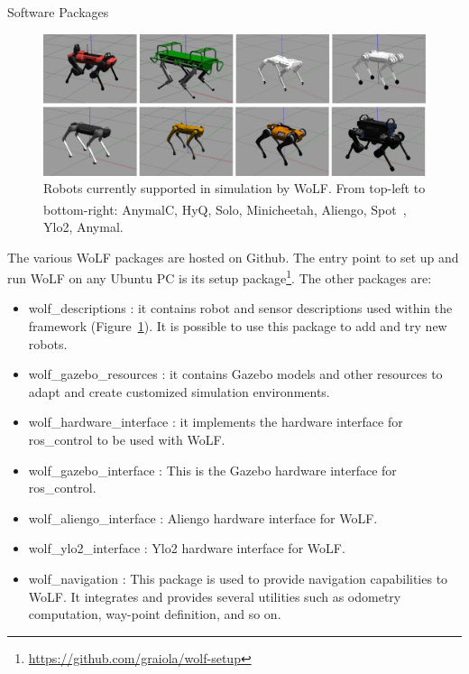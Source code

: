 \begin{myblock}{\large Software Packages}

	\begin{figure}[thb!]
		\centering
		\includegraphics[width=0.8\columnwidth]{images/all_robots.pdf}
		\caption{Robots currently supported in simulation by WoLF. From top-left to bottom-right: AnymalC, HyQ, Solo, Minicheetah, Aliengo, Spot\textsuperscript\textregistered \ , Ylo2, Anymal.}
		\label{fig:robots}
	\end{figure}
	
	The various WoLF packages are hosted on Github. The entry point to set up and run WoLF on any Ubuntu PC is its setup package\footnote{\url{https://github.com/graiola/wolf-setup}}. The other packages are:
	\begin{itemize}
		\item wolf\_descriptions%
		: it contains robot and sensor descriptions used within the framework (Figure~\ref{fig:robots}). It is possible to use this package to add and try new robots.
		\item wolf\_gazebo\_resources%
		: it contains Gazebo models and other resources to adapt and create customized simulation environments.
		\item wolf\_hardware\_interface%
		: it implements the hardware interface for ros\_control to be used with WoLF.
		\item wolf\_gazebo\_interface%
		: This is the Gazebo hardware interface for ros\_control.
		\item wolf\_aliengo\_interface%
		: Aliengo hardware interface for WoLF. 
		\item wolf\_ylo2\_interface%
		: Ylo2 hardware interface for WoLF.
		\item wolf\_navigation%
		: This package is used to provide navigation capabilities to WoLF. It integrates and provides several utilities such as odometry computation, way-point definition, and so on.
	\end{itemize}
\end{myblock}	
	
